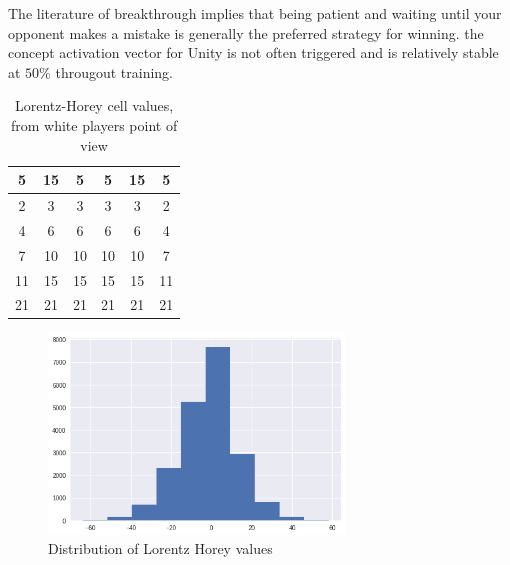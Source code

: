 The literature of breakthrough implies that being patient and waiting until your opponent makes a mistake is generally the preferred strategy for winning. the concept activation vector for Unity is not often triggered and is relatively stable at $50\%$ througout training.

\begin{table}[]
    \centering
    \begin{tabular}{|c|c|c|c|c|c|}
        \hline
        5  & 15 & 5  & 5  & 15 & 5  \\\hline
        2  & 3  & 3  & 3  & 3  & 2  \\\hline
        4  & 6  & 6  & 6  & 6  & 4  \\\hline
        7  & 10 & 10 & 10 & 10 & 7  \\\hline
        11 & 15 & 15 & 15 & 15 & 11 \\\hline
        21 & 21 & 21 & 21 & 21 & 21 \\\hline
    \end{tabular}
    \caption{Lorentz-Horey cell values, from white players point of view}
    \label{table:lorentzcell}
\end{table}

\begin{figure}
    \begin{small}
        \begin{center}
            \includegraphics[width=0.7\textwidth]{graphics/lorentz_horey_distribution.png}
        \end{center}
        \caption{Distribution of Lorentz Horey values}
        \label{fig:lorentzdistribution}
    \end{small}
\end{figure}

